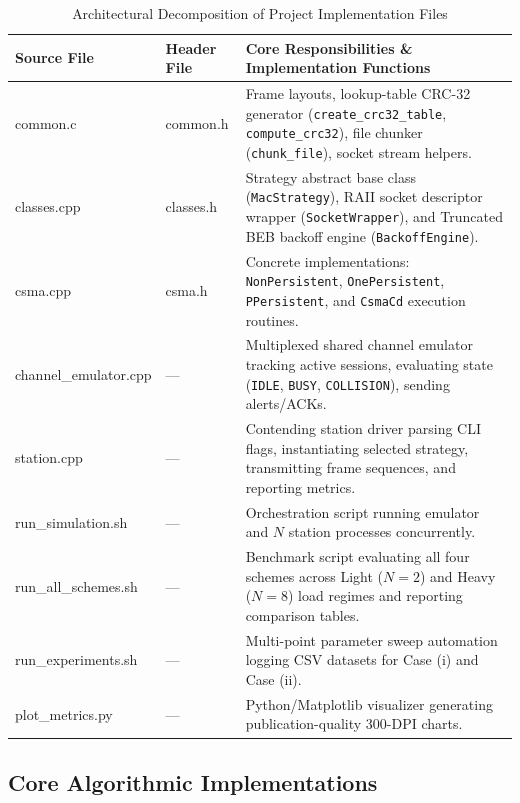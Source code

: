 \documentclass[11pt,a4paper]{article}
\begin{document}
\begin{table}[htbp]
\centering
\scriptsize
\renewcommand{\arraystretch}{1.15}
\begin{tabular}{>{\ttfamily\color{navyblue}}l l p{8.8cm}}
\rowcolor{tableheader}
\color{white}Source File & \color{white}Header File & \color{white}Core Responsibilities \& Implementation Functions \\
\hline
common.c & common.h & Frame layouts, lookup-table CRC-32 generator (\texttt{create\_crc32\_table}, \texttt{compute\_crc32}), file chunker (\texttt{chunk\_file}), socket stream helpers. \\
classes.cpp & classes.h & Strategy abstract base class (\texttt{MacStrategy}), RAII socket descriptor wrapper (\texttt{SocketWrapper}), and Truncated BEB backoff engine (\texttt{BackoffEngine}). \\
csma.cpp & csma.h & Concrete implementations: \texttt{NonPersistent}, \texttt{OnePersistent}, \texttt{PPersistent}, and \texttt{CsmaCd} execution routines. \\
channel\_emulator.cpp & --- & Multiplexed shared channel emulator tracking active sessions, evaluating state (\texttt{IDLE}, \texttt{BUSY}, \texttt{COLLISION}), sending alerts/ACKs. \\
station.cpp & --- & Contending station driver parsing CLI flags, instantiating selected strategy, transmitting frame sequences, and reporting metrics. \\
run\_simulation.sh & --- & Orchestration script running emulator and $N$ station processes concurrently. \\
run\_all\_schemes.sh & --- & Benchmark script evaluating all four schemes across Light ($N=2$) and Heavy ($N=8$) load regimes and reporting comparison tables. \\
run\_experiments.sh & --- & Multi-point parameter sweep automation logging CSV datasets for Case (i) and Case (ii). \\
plot\_metrics.py & --- & Python/Matplotlib visualizer generating publication-quality 300-DPI charts. \\
\bottomrule
\end{tabular}
\caption{Architectural Decomposition of Project Implementation Files}
\label{tab:code_breakdown}
\end{table}

\subsection{Core Algorithmic Implementations}
\end{document}

